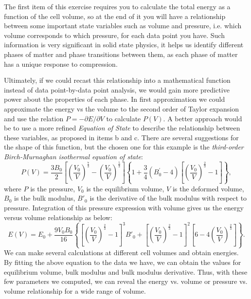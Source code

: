 \documentclass[12pt]{article}
\begin{document}
The first item of this exercise requires you to calculate the total energy as a function
of the cell volume, so at the end of it you will have a relationship between some important
state variables such as volume and pressure, i.e. which volume corresponds to which pressure,
for each data point you have. 
Such information is very significant in solid state physics, it helps us identify different
phases of matter and phase transitions between them, as each phase of matter has a unique
response to compression.

Ultimately, if we could recast this relationship into a mathematical function instead of
data point-by-data point analysis, we would gain more predictive power about the properties
of each phase.
In first approximation we could approximate the energy vs the volume to the second order
of Taylor expansion and use the relation $P=-\partial{E} / \partial{V}$ to calculate $P(V)$.
A better approach would be to use a more refined \textit{Equation of State} to describe
the relationship between these variables, as proposed in items b and c.
There are several suggestions for the shape of this function, but the chosen one for
this example is the {\it third-order Birch-Murnaghan isothermal equation of state}:
%
\begin{equation}
    P(V) = \frac{3B_0}{2}
    \left[ 
        \left(\frac{V_0}{V}\right)^\frac{7}{3} - 
        \left(\frac{V_0}{V}\right)^\frac{5}{3}
    \right] 
    \left\{
        1 +
        \frac{3}{4}(B^\prime_0 - 4)
        \left[
        \left(\frac{V_0}{V}\right)^\frac{2}{3} - 1
        \right]
    \right\} , 
\end{equation}
%
where $P$ is the pressure, $V_0$ is the equilibrium volume, $V$ is the deformed volume,
$B_0$ is the bulk modulus, $B'_0$ is the derivative of the bulk modulus with respect to
pressure. 
Integration of this pressure expression with volume gives us the energy versus volume
relationship as below:
% 
\begin{equation}
    E(V) = E_0 +
    \frac{9V_0B_0}{16}
    \left\{
        \left[ \left(\frac{V_0}{V}\right)^\frac{2}{3} - 1 \right]^3 B'_0 +
        \left[ \left(\frac{V_0}{V}\right)^\frac{2}{3} - 1 \right]^2
        \left[ 6 - 4 \left(\frac{V_0}{V}\right)^\frac{2}{3} \right]
    \right\}.
\end{equation}
% 
We can make several calculations at different cell volumes and obtain energies.
By fitting the above equation to the data we have, we can obtain the values for
equilibrium volume, bulk modulus and bulk modulus derivative.
Thus, with these few parameters we computed, we can reveal the energy vs. volume or
pressure vs. volume relationship for a wide range of volume.
\end{document}
